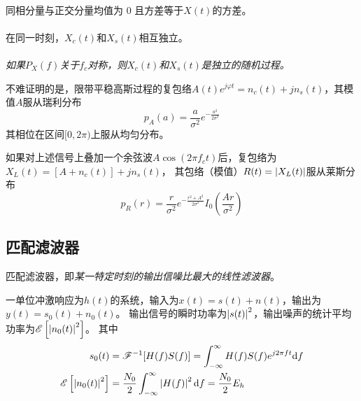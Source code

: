     \paragraph{}同相分量与正交分量均值为 0 且方差等于$X(t)$的方差。
    \paragraph{}在同一时刻，$X_c(t)$和$X_s(t)$相互独立。
    \paragraph{}\emph{如果$P_X(f)$关于$f_c$对称，则$X_c(t)$和$X_s(t)$是独立的随机过程。}
    \vspace{2ex}

    不难证明的是，限带平稳高斯过程的复包络$A(t)e^{j\varphi{t}}=n_c(t)+jn_s(t)$，其模值$A$服从瑞利分布
    \begin{equation}\label{eq:Rayleigh}
        p_A(a)=\frac{a}{\sigma^2}e^{-\frac{a^2}{2\sigma^2}}
    \end{equation}
    其相位在区间$[0,2\pi)$上服从均匀分布。

    如果对上述信号上叠加一个余弦波$A\cos(2\pi f_ct)$后，复包络为$X_L(t)=[A+n_c(t)]+jn_s(t)$，
    其包络（模值）$R(t)=\left\vert X_L(t) \right\vert$服从莱斯分布
    \begin{equation}\label{eq:Rician-distribution}
        p_R(r)=\frac{r}{\sigma^2}e^{-\frac{r^2+A^2}{2\sigma^2}}I_0\left(\frac{Ar}{\sigma^2}\right)
    \end{equation}

\subsection{匹配滤波器}\label{subsec:matched-filter}
    匹配滤波器，即\emph{某一特定时刻的输出信噪比最大的线性滤波器}。
    
    一单位冲激响应为$h(t)$的系统，输入为$x(t)=s(t)+n(t)$，输出为$y(t)=s_0(t)+n_0(t)$。
    输出信号的瞬时功率为$\left\vert s(t) \right\vert^2$，输出噪声的统计平均功率为$\mathscr{E}\left[\left\vert n_0(t) \right\vert^2\right]$。
    其中
    \begin{align}
        s_0(t)&=\mathscr{F}^{-1}[H(f)S(f)]=\int_{-\infty}^{\infty}H(f)S(f)e^{j2\pi ft}\text{\upshape d} f\\
        \mathscr{E}\left[\left\vert n_0(t) \right\vert^2\right]&=\frac{N_0}{2}\int_{-\infty}^{\infty}\left\vert H(f) \right\vert^2\text{\upshape d} f=\frac{N_0}{2}E_h
    \end{align}


